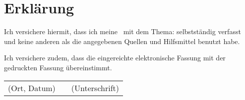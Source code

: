 \clearpage

\thispagestyle{kapitelkopfzeile}

\chapter*{Erklärung}

Ich versichere hiermit, dass ich meine \typMeinerArbeit\ mit dem Thema: \emph{\themaMeinerArbeit} selbstständig verfasst und keine anderen als die angegebenen Quellen und Hilfsmittel benutzt habe. 

Ich versichere zudem, dass die eingereichte elektronische Fassung mit der gedruckten Fassung übereinstimmt.

\vspace{3cm}

\begin{center}
\begin{tabular}{ccc}
(Ort, Datum) & \hspace{0.3\linewidth} & (Unterschrift)
\end{tabular}
\end{center}